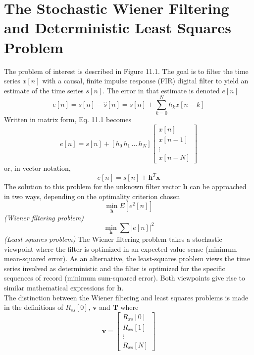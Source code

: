 \documentclass[11pt]{report}
\theoremstyle{example}
\begin{document}
\section[Wiener Filtering and Least Squares]{The Stochastic Wiener Filtering and Deterministic Least Squares Problem}
The problem of interest is described in Figure 11.1. The goal is to filter the time series $x[n]$ with a causal, finite impulse response (FIR) digital filter to yield an estimate of the time series $s[n]$. The error in that estimate is denoted $e[n]$
\begin{equation}
	e[n]=s[n]-\hat{s}[n]=s[n]+\sum_{k=0}^N{h_kx[n-k]}
\end{equation}
Written in matrix form, Eq. 11.1 becomes
\begin{equation}
	e[n]=s[n]+[h_0\,h_1\,\dots\,h_N]
	\begin{bmatrix}
		x[n]\\
		x[n-1]\\
		\vdots\\
		x[n-N]
	\end{bmatrix}
\end{equation}
or, in vector notation,
\begin{equation}
	e[n]=s[n]+\mathbf{h}^T\mathbf{x}
\end{equation}
The solution to this problem for the unknown filter vector $\mathbf{h}$ can be approached in two ways, depending on the optimality criterion chosen
\begin{equation}
	\min_{\mathbf{h}}E\left[e^2[n]\right]
\end{equation}
\emph{(Wiener filtering problem)}
\begin{equation}
	\min_{\mathbf{h}}\sum{|e[n]|^2}
\end{equation}
\emph{(Least squares problem)}
The Wiener filtering problem takes a stochastic viewpoint where the filter is optimized in an expected value sense (minimum mean-squared error). As an alternative, the least-squares problem views the time series involved as deterministic and the filter is optimized for the specific sequences of record (minimum sum-squared error). Both viewpoints give rise to similar mathematical expressions for $\mathbf{h}$.\\
The distinction between the Wiener filtering and least squares problems is made in the definitions of $R_{ss}[0]$, $\mathbf{v}$ and $\mathbf{T}$ where
\begin{equation}
	\mathbf{v}=
	\begin{bmatrix}
		R_{xs}[0]\\
		R_{xs}[1]\\
		\vdots\\
		R_{xs}[N]
	\end{bmatrix}
\end{equation}
\end{document}
